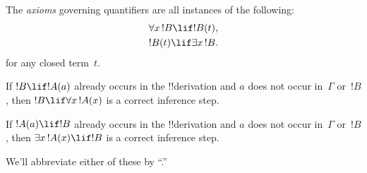 \documentclass[../../../include/open-logic-section]{subfiles}
\begin{document}


\begin{defn}
The \emph{axioms} governing quantifiers are
all instances of the following:
\begin{align}
\ollabel{ax:q1} & \lforall[x][!B] \lif !B(t), \\
\ollabel{ax:q2} & !B(t) \lif \lexists[x][!B].
\end{align}
for any closed term~$t$.
\end{defn}

\begin{defn}
\item If $!B \lif !A(a)$ already occurs in the !!{derivation} and $a$
  does not occur in~$\Gamma$ or~$!B$, then $!B \lif
  \lforall[x][!A(x)]$ is a correct inference step.
\item If $!A(a) \lif !B$ already occurs in the !!{derivation} and $a$
  does not occur in~$\Gamma$ or~$!B$, then $\lexists[x][!A(x)] \lif
  !B$ is a correct inference step.
\end{defn}

We'll abbreviate either of these by ``\QR.''
\end{document}
